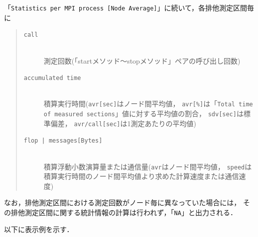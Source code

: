 「{\tt Statistics per MPI process [Node Average]}」に続いて，各排他測定区間毎に

\begin{quote}
\begin{description}
\item[\tt call]\mbox{}\\
 測定回数(「startメソッド〜stopメソッド」ペアの呼び出し回数)
\item[\tt accumulated time]\mbox{}\\
 積算実行時間({\tt avr[sec]}はノード間平均値，
{\tt avr[\%]}は「{\tt Total time of measured sections}」値に対する平均値の割合，
{\tt sdv[sec]}は標準偏差，
{\tt avr/call[sec]}は1測定あたりの平均値)
\item[{\tt flop | messages[Bytes]}]\mbox{}\\
積算浮動小数演算量または通信量({\tt avr}はノード間平均値，
{\tt speed}は積算実行時間のノード間平均値より求めた計算速度または通信速度)
\end{description}
\end{quote}

なお，排他測定区間における測定回数がノード毎に異なっていた場合には，
その排他測定区間に関する統計情報の計算は行われず，「{\tt NA}」と出力される．

以下に表示例を示す．

